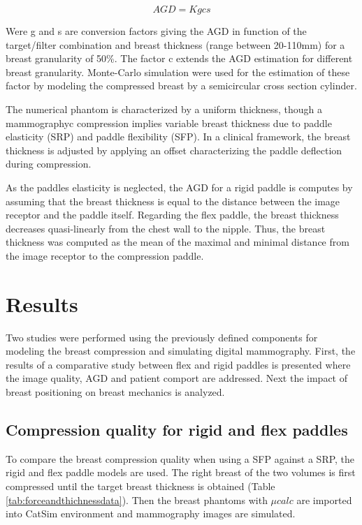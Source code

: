 \begin{equation}
AGD = K g c s
\end{equation}

Were g and s are conversion factors giving the AGD in function of the target/filter combination and breast thickness (range between 20-110mm) for a breast granularity of 50\%. The factor c extends the AGD estimation for different breast granularity. Monte-Carlo simulation were used for the estimation of these factor by modeling the compressed breast by a semicircular cross section cylinder. 

The numerical phantom is characterized by a uniform thickness, though a mammographyc compression implies variable breast thickness due to paddle elasticity (SRP) and paddle flexibility (SFP). In a clinical framework, the breast thickness is adjusted by applying an offset characterizing the paddle deflection during compression.      

As the paddles elasticity is neglected, the AGD for a rigid paddle is computes by assuming that the breast thickness is equal to the distance between the image receptor and the paddle itself. Regarding the flex paddle, the breast thickness decreases quasi-linearly from the chest wall to the nipple. Thus, the breast thickness was computed as the mean of the maximal and minimal distance from the image receptor to the compression paddle.

\section{Results}\label{section:breastcompressionevaluation}
Two studies were performed using the previously defined components for modeling the breast compression and simulating digital mammography. First, the results of a comparative study between flex and rigid paddles is presented where the image quality, AGD and patient comport are addressed. Next the impact of breast positioning on breast mechanics is analyzed.   
\subsection{Compression quality for rigid and flex paddles}

To compare the breast compression quality when using a SFP against a SRP, the rigid and flex paddle models are used. The right breast of the two volumes is first compressed until the target breast thickness is obtained (Table \ref{tab:forceandthichnessdata}). Then the breast phantoms with $\mu calc $  are imported into CatSim environment and mammography images are simulated.

